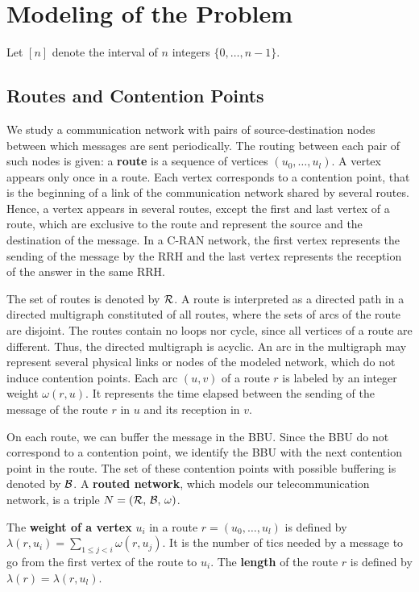 \documentclass[a4paper,10pt]{article}
\begin{document}
\section{Modeling of the Problem}\label{sec:def}

Let $[n]$ denote the interval of $n$ integers $\{0,\dots,n-1\}$.


	\subsection{Routes and Contention Points}

  	We study a communication network with pairs of source-destination nodes between which messages are sent periodically. The routing between each pair of such nodes is given: a \textbf{route} is a sequence of vertices $(u_0, \ldots , u_{l})$. A vertex appears only once in a route. Each vertex corresponds to a contention point, that is the beginning of a link of the communication network shared by several routes. Hence, a vertex appears in several routes, except the first and last vertex of a route, which are exclusive to the route and represent the source and the destination of the message. In a C-RAN network, the first vertex represents the sending of the message by the RRH and the last vertex represents the reception of the answer in the same RRH. 

  	The set of routes is denoted by ${\cal R}$. A route is interpreted as a directed path in a directed multigraph constituted of all routes, where the sets of arcs of the route are disjoint. The routes contain no loops nor cycle, since all vertices of a route are different. Thus, the directed multigraph is acyclic. An arc in the multigraph may represent several physical links or nodes of the modeled network, which do not induce contention points. Each arc $(u,v)$ of a route $r$ is labeled by an integer weight $\omega(r,u)$. It represents the time elapsed between the sending of the message of the route $r$ in $u$ and its reception in $v$.

  	On each route, we can buffer the message in the BBU. Since the BBU do not correspond to a contention point, we identify the BBU with the next contention point in the route. The set of these contention points with possible buffering is denoted by ${\cal B}$.
  	A \textbf{routed network}, which models our telecommunication network, is a triple $N = (\cal{R},\,\cal{B},\,\omega)$. 


    The {\bf weight of a vertex} $u_i$ in a route $r=(u_0,\dots,u_l)$ is defined by $\lambda(r,u_i)= \sum\limits_{1 \leq j <i} \omega(r,u_j)$. It is the number of tics needed by a message to go from the first vertex of the route to $u_i$. The \textbf{length} of the route $r$ is defined by $\lambda(r)= \lambda(r,u_l)$. 
\end{document}
